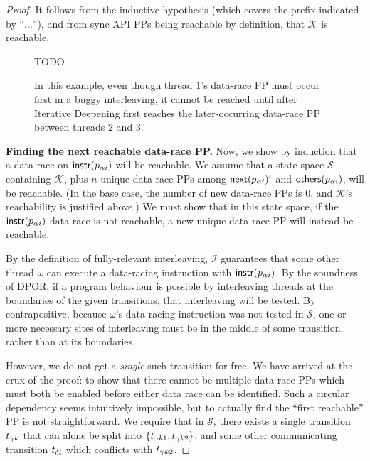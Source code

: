 \begin{proof}
It follows from the inductive hypothesis (which covers the prefix indicated by ``$...$''),
and from sync API PPs being reachable by definition,
that $\mathcal{K}$ is reachable.

\begin{figure}[t]
	TODO %
	\caption{In this example, even though thread 1's data-race PP must occur first in a buggy interleaving, it cannot be reached until after Iterative Deepening first reaches the later-occurring data-race PP between threads 2 and 3.}
	\label{fig:threethreads}
\end{figure}

{\bf Finding the next reachable data-race PP.}
Now, we show by induction that a data race on $\mathsf{instr}(p_{\alpha{}i})$ will be reachable.
We assume that a state space $\mathcal{S}$ containing $\mathcal{K}$,
plus $n$ unique data race PPs among $\mathsf{next}(p_{\alpha{}i})'$ and $\mathsf{others}(p_{\alpha{}i})$,
will be reachable.
(In the base case, the number of new data-race PPs is 0, and $\mathcal{K}$'s reachability is justified above.)
We must show that in this state space, if the $\mathsf{instr}(p_{\alpha{}i})$ data race is not reachable,
a new unique data-race PP will instead be reachable.

By the definition of fully-relevant interleaving, $\mathcal{I}$ guarantees that some other thread $\omega$ can execute a data-racing instruction with $\mathsf{instr}(p_{\alpha{}i})$.
%
By the soundness of DPOR, if a program behaviour is possible by interleaving threads at the boundaries of
the given transitions, that interleaving will be tested.
By contrapositive,
because $\omega$'s data-racing instruction was not tested in $\mathcal{S}$, one or more necessary sites of interleaving must be in the middle of some transition, rather than at its boundaries.

However, we do not get a {\em single} such transition for free.
We have arrived at the crux of the proof:
to show that there cannot be multiple data-race PPs which must both be enabled before either data race can be identified.
Such a circular dependency seems intuitively impossible, but to actually find the ``first reachable'' PP is not straightforward.
We require that in $\mathcal{S}$, there exists a single transition $t_{\gamma{}k}$ that can alone be split into $\{t_{\gamma{}k1},t_{\gamma{}k2}\}$,
and some other communicating transition $t_{\delta{}l}$ which conflicts with $t_{\gamma{}k2}$.


\end{proof}
